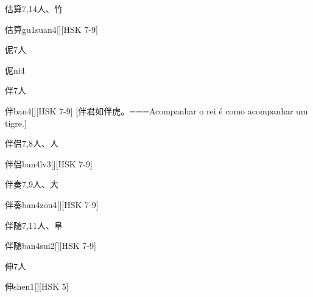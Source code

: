 \begin{Entry}{估算}{7,14}{⼈、⽵}
  \begin{Phonetics}{估算}{gu1suan4}[][HSK 7-9]
  \end{Phonetics}
\end{Entry}

\begin{Entry}{伲}{7}{⼈}
  \begin{Phonetics}{伲}{ni4}
  \end{Phonetics}
\end{Entry}

\begin{Entry}{伴}{7}{⼈}
  \begin{Phonetics}{伴}{ban4}[][HSK 7-9]
    [伴君如伴虎。===Acompanhar o rei é como acompanhar um tigre.]
  \end{Phonetics}
\end{Entry}

\begin{Entry}{伴侣}{7,8}{⼈、⼈}
  \begin{Phonetics}{伴侣}{ban4lv3}[][HSK 7-9]
  \end{Phonetics}
\end{Entry}

\begin{Entry}{伴奏}{7,9}{⼈、⼤}
  \begin{Phonetics}{伴奏}{ban4zou4}[][HSK 7-9]
  \end{Phonetics}
\end{Entry}

\begin{Entry}{伴随}{7,11}{⼈、⾩}
  \begin{Phonetics}{伴随}{ban4sui2}[][HSK 7-9]
  \end{Phonetics}
\end{Entry}

\begin{Entry}{伸}{7}{⼈}
  \begin{Phonetics}{伸}{shen1}[][HSK 5]
  \end{Phonetics}
\end{Entry}

